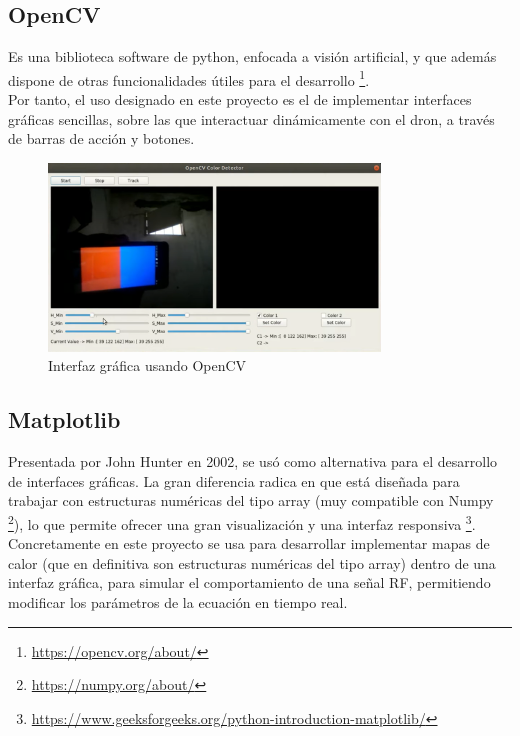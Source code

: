 \subsection{OpenCV}
\label{subsec:opencv}

Es una biblioteca software de python, enfocada a visión artificial, y que además dispone de otras funcionalidades útiles para el desarrollo \footnote[11]{\url{https://opencv.org/about/}}.\\

Por tanto, el uso designado en este proyecto es el de implementar interfaces gráficas sencillas, sobre las que interactuar dinámicamente con el dron, a través de barras de acción y botones.

\begin{figure} [H]
	\begin{center}
	\includegraphics[height=5cm]{imagenes/cap3/5_opencv_example.png}
	\end{center}
	\caption[Interfaz gráfica usando OpenCV]{Interfaz gráfica usando OpenCV}
	\label{fig:opencv}
\end{figure}

\subsection{Matplotlib}
\label{subsec:matplotlib}

Presentada por John Hunter en 2002, se usó como alternativa para el desarrollo de interfaces gráficas. La gran diferencia radica en que está diseñada para trabajar con estructuras numéricas del tipo array (muy compatible con Numpy \footnote[12]{\url{https://numpy.org/about/}}), lo que permite ofrecer una gran visualización y una interfaz responsiva \footnote[13]{\url{https://www.geeksforgeeks.org/python-introduction-matplotlib/}}.\\

Concretamente en este proyecto se usa para desarrollar implementar mapas de calor (que en definitiva son estructuras numéricas del tipo array) dentro de una interfaz gráfica, para simular el comportamiento de una señal \ac{RF}, permitiendo modificar los parámetros de la ecuación en tiempo real.

